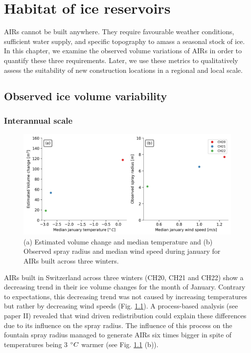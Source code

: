 \chapter{Habitat of ice reservoirs}


AIRs cannot be built anywhere. They require favourable weather conditions, sufficient water supply, and specific
topography to amass a seasonal stock of ice. In this chapter, we examine the observed volume variations of AIRs
in order to quantify these three requirements. Later, we use these metrics to qualitatively assess the
suitability of new construction locations in a regional and local scale.

\section{Observed ice volume variability}

\subsection{Interannual scale}

\begin{figure}[htb]
\centering
\includegraphics[width=\textwidth]{figs/CH_diffs.jpg}
\caption{(a) Estimated volume change and median temperature and (b) Observed spray radius and median wind speed
during january for AIRs built across three winters. } 
\label{fig:CH_diffs}
\end{figure}

AIRs built in Switzerland across three winters (CH20, CH21 and CH22) show a decreasing trend in their ice volume
changes for the month of January. Contrary to expectations, this decreasing trend was not caused by increasing
temperatures but rather by decreasing wind speeds (Fig. \ref{fig:CH_diffs}). A process-based analysis (see paper
II) revealed that wind driven redistribution could explain these differences due to its influence on the spray
radius. The influence of this process on the fountain spray radius managed to generate AIRs six times bigger in
spite of temperatures being 3 $^{\circ} C$ warmer (see Fig. \ref{fig:CH_diffs} (b)). 

